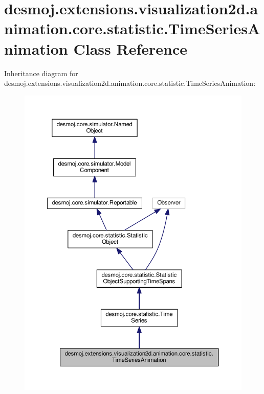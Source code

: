 \section{desmoj.\-extensions.\-visualization2d.\-animation.\-core.\-statistic.\-Time\-Series\-Animation Class Reference}
\label{classdesmoj_1_1extensions_1_1visualization2d_1_1animation_1_1core_1_1statistic_1_1_time_series_animation}


Inheritance diagram for desmoj.\-extensions.\-visualization2d.\-animation.\-core.\-statistic.\-Time\-Series\-Animation\-:
\nopagebreak
\begin{figure}[H]
\begin{center}
\leavevmode
\includegraphics[width=350pt]{classdesmoj_1_1extensions_1_1visualization2d_1_1animation_1_1core_1_1statistic_1_1_time_series_animation__inherit__graph}
\end{center}
\end{figure}


